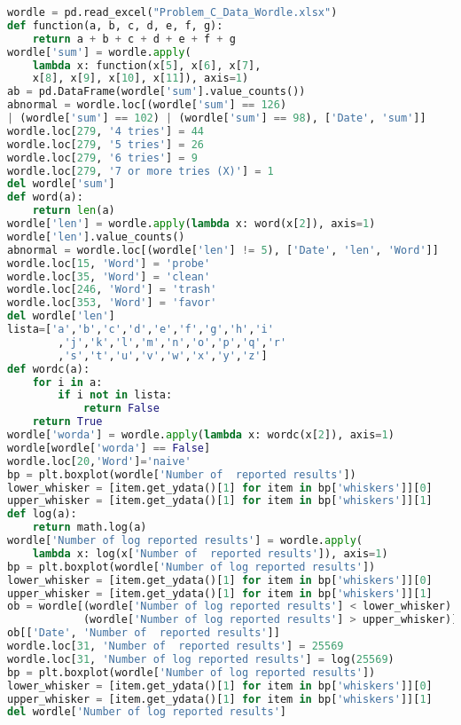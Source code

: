 \documentclass[12pt]{article}  %
\begin{document}
\begin{subappendices}
\begin{lstlisting}[language=PYTHON, name={clean.ipynb}]
wordle = pd.read_excel("Problem_C_Data_Wordle.xlsx")
def function(a, b, c, d, e, f, g):
    return a + b + c + d + e + f + g
wordle['sum'] = wordle.apply(
    lambda x: function(x[5], x[6], x[7],
    x[8], x[9], x[10], x[11]), axis=1)
ab = pd.DataFrame(wordle['sum'].value_counts())
abnormal = wordle.loc[(wordle['sum'] == 126) 
| (wordle['sum'] == 102) | (wordle['sum'] == 98), ['Date', 'sum']]
wordle.loc[279, '4 tries'] = 44
wordle.loc[279, '5 tries'] = 26
wordle.loc[279, '6 tries'] = 9
wordle.loc[279, '7 or more tries (X)'] = 1
del wordle['sum']
def word(a):
    return len(a)
wordle['len'] = wordle.apply(lambda x: word(x[2]), axis=1)
wordle['len'].value_counts()
abnormal = wordle.loc[(wordle['len'] != 5), ['Date', 'len', 'Word']]
wordle.loc[15, 'Word'] = 'probe'
wordle.loc[35, 'Word'] = 'clean'
wordle.loc[246, 'Word'] = 'trash'
wordle.loc[353, 'Word'] = 'favor'
del wordle['len']
lista=['a','b','c','d','e','f','g','h','i'
        ,'j','k','l','m','n','o','p','q','r'
        ,'s','t','u','v','w','x','y','z']
def wordc(a):
    for i in a:
        if i not in lista:
            return False
    return True  
wordle['worda'] = wordle.apply(lambda x: wordc(x[2]), axis=1)
wordle[wordle['worda'] == False]
wordle.loc[20,'Word']='naive'
bp = plt.boxplot(wordle['Number of  reported results'])
lower_whisker = [item.get_ydata()[1] for item in bp['whiskers']][0]
upper_whisker = [item.get_ydata()[1] for item in bp['whiskers']][1]
def log(a):
    return math.log(a)
wordle['Number of log reported results'] = wordle.apply(
    lambda x: log(x['Number of  reported results']), axis=1)
bp = plt.boxplot(wordle['Number of log reported results'])
lower_whisker = [item.get_ydata()[1] for item in bp['whiskers']][0]
upper_whisker = [item.get_ydata()[1] for item in bp['whiskers']][1]
ob = wordle[(wordle['Number of log reported results'] < lower_whisker) |
            (wordle['Number of log reported results'] > upper_whisker)]
ob[['Date', 'Number of  reported results']]
wordle.loc[31, 'Number of  reported results'] = 25569
wordle.loc[31, 'Number of log reported results'] = log(25569)
bp = plt.boxplot(wordle['Number of log reported results'])
lower_whisker = [item.get_ydata()[1] for item in bp['whiskers']][0]
upper_whisker = [item.get_ydata()[1] for item in bp['whiskers']][1]
del wordle['Number of log reported results']

\end{lstlisting}

\end{subappendices}  %
\end{document}
